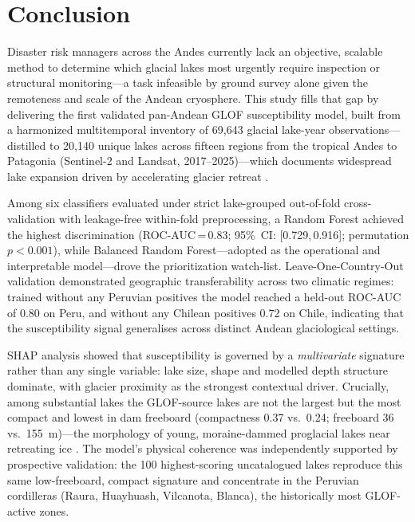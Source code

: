 \documentclass[pdflatex,sn-basic]{sn-jnl}%
\begin{document}
\section{Conclusion}\label{sec:conclusion}

Disaster risk managers across the Andes currently lack an objective,
scalable method to determine which glacial lakes most urgently require
inspection or structural monitoring---a task infeasible by ground survey
alone given the remoteness and scale of the Andean cryosphere.
This study fills that gap by delivering the first validated pan-Andean
GLOF susceptibility model, built from a harmonized multitemporal
inventory of 69{,}643 glacial lake-year observations---distilled to
20{,}140 unique lakes across fifteen regions from the tropical Andes to
Patagonia (Sentinel-2 and Landsat, 2017--2025)---which documents
widespread lake expansion driven by accelerating glacier retreat
\citep{Dussaillant2019,GlaMBIE2025}.

Among six classifiers evaluated under strict lake-grouped out-of-fold
cross-validation with leakage-free within-fold preprocessing, a Random
Forest achieved the highest discrimination (ROC-AUC\,=\,0.83; 95\%~CI:
[0.729,\,0.916]; permutation $p<0.001$), while Balanced Random
Forest---adopted as the operational and interpretable model---drove the
prioritization watch-list. Leave-One-Country-Out validation demonstrated
geographic transferability across two climatic regimes: trained without
any Peruvian positives the model reached a held-out ROC-AUC of 0.80 on
Peru, and without any Chilean positives 0.72 on Chile, indicating that the
susceptibility signal generalises across distinct Andean glaciological
settings.

SHAP analysis showed that susceptibility is governed by a \emph{multivariate}
signature rather than any single variable: lake size, shape and modelled
depth structure dominate, with glacier proximity as the strongest
contextual driver. Crucially, among substantial lakes the GLOF-source
lakes are not the largest but the most compact and lowest in dam freeboard
(compactness 0.37 vs.\ 0.24; freeboard 36 vs.\ 155~m)---the morphology of
young, moraine-dammed proglacial lakes near retreating ice
\citep{Clague2000,Westoby2014,Emmer2013}. The model's physical coherence
was independently supported by prospective validation: the 100
highest-scoring uncatalogued lakes reproduce this same low-freeboard,
compact signature and concentrate in the Peruvian cordilleras (Raura,
Huayhuash, Vilcanota, Blanca), the historically most GLOF-active zones.
\end{document}
